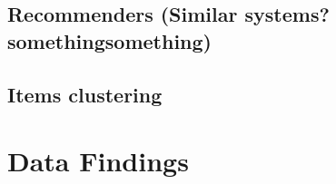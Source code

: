 


\subsection{Recommenders (Similar systems? somethingsomething)}
\subsection{Items clustering}

\section{Data Findings}
